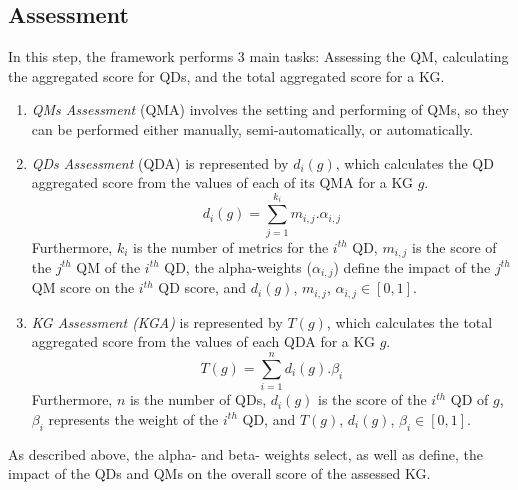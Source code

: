 \documentclass[runningheads]{llncs}
\begin{document}



\subsection{Assessment}
In this step, the framework performs 3 main tasks: Assessing the QM, calculating the aggregated score for QDs, and the total aggregated score for a KG. 
\begin{enumerate}
  \item[i.] \textit{QMs Assessment} (QMA) involves the setting and performing of QMs, so they can be performed either manually, semi-automatically, or automatically.
  \item[ii.] \textit{QDs Assessment} (QDA) is represented by $d_{i}(g)$, which calculates the QD aggregated score from the values of each of its QMA for a KG $g$. 
%   
 \[ d_{i}(g) = \sum _{j=1}^{k_{i}}{m_{i,j}}.\alpha_{i,j} \] 
%
  Furthermore, $k_{i}$ is the number of metrics for the $i^{th}$ QD, $m_{i,j}$ is the score of the $j^{th}$ QM of the $i^{th}$ QD, the alpha-weights ($\alpha_{i,j}$) define the impact of the $j^{th}$ QM score on the $i^{th}$ QD score, and $d_{i}(g)$, $m_{i,j}$, $\alpha_{i,j} \in [0,1]$.
  \item[iii.] \textit{KG Assessment (KGA)} is represented by $T(g)$, which calculates the total aggregated score from the values of each QDA for a KG $g$. 
%   
 \[ T(g) = \sum _{i=1}^{n}{d_{i}(g)}.\beta_{i} \] 
%  
  Furthermore, $n$ is the number of QDs, ${d_{i}(g)}$ is the score of the $i^{th}$ QD of $g$, $\beta_{i}$ represents the weight of the $i^{th}$ QD, and $T(g)$, $d_i(g)$, $\beta_i \in [0,1]$.
\end{enumerate}
As described above, the alpha- and beta- weights select, as well as define, the impact of the QDs and QMs on the overall score of the assessed KG.
\end{document}
